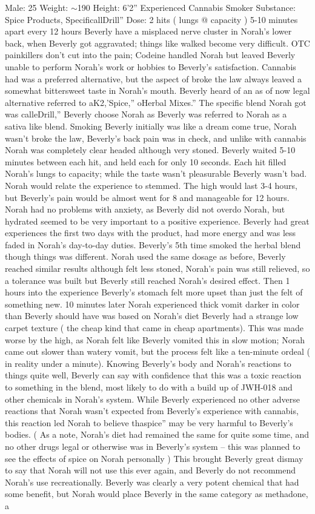 \documentclass[12pt]{book}
\begin{document}
Male: 25 Weight: $\sim$190 Height: 6'2'' Experienced Cannabis Smoker Substance: Spice Products, SpecificallDrill'' Dose: 2 hits ( lungs @  capacity ) 5-10 minutes apart every 12 hours Beverly have a misplaced nerve cluster in Norah's lower back, when Beverly got aggravated; things like walked become very difficult. OTC painkillers don't cut into the pain; Codeine handled Norah but leaved Beverly unable to perform Norah's work or hobbies to Beverly's satisfaction. Cannabis had was a preferred alternative, but the aspect of broke the law always leaved a somewhat bittersweet taste in Norah's mouth. Beverly heard of an as of now legal alternative referred to aK2,'Spice,'' oHerbal Mixes.'' The specific blend Norah got was calleDrill,'' Beverly choose Norah as Beverly was referred to Norah as a sativa like blend. Smoking Beverly initially was like a dream come true, Norah wasn't broke the law, Beverly's back pain was in check, and unlike with cannabis Norah was completely clear headed although very stoned. Beverly waited 5-10 minutes between each hit, and held each for only 10 seconds. Each hit filled Norah's lungs to  capacity; while the taste wasn't pleasurable Beverly wasn't bad. Norah would relate the experience to stemmed. The high would last 3-4 hours, but Beverly's pain would be almost went for 8 and manageable for 12 hours. Norah had no problems with anxiety, as Beverly did not overdo Norah, but hydrated seemed to be very important to a positive experience. Beverly had great experiences the first two days with the product, had more energy and was less faded in Norah's day-to-day duties. Beverly's 5th time smoked the herbal blend though things was different. Norah used the same dosage as before, Beverly reached similar results although felt less stoned, Norah's pain was still relieved, so a tolerance was built but Beverly still reached Norah's desired effect. Then 1 hours into the experience Beverly's stomach felt more upset than just the felt of something new. 10 minutes later Norah experienced thick vomit darker in color than Beverly should have was based on Norah's diet Beverly had a strange low carpet texture ( the cheap kind that came in cheap apartments). This was made worse by the high, as Norah felt like Beverly vomited this in slow motion; Norah came out slower than watery vomit, but the process felt like a ten-minute ordeal ( in reality under a minute). Knowing Beverly's body and Norah's reactions to things quite well, Beverly can say with confidence that this was a toxic reaction to something in the blend, most likely to do with a build up of JWH-018 and other chemicals in Norah's system. While Beverly experienced no other adverse reactions that Norah wasn't expected from Beverly's experience with cannabis, this reaction led Norah to believe thaspice'' may be very harmful to Beverly's bodies. ( As a note, Norah's diet had remained the same for quite some time, and no other drugs legal or otherwise was in Beverly's system -- this was planned to see the effects of spice on Norah personally ) This brought Beverly great dismay to say that Norah will not use this ever again, and Beverly do not recommend Norah's use recreationally. Beverly was clearly a very potent chemical that had some benefit, but Norah would place Beverly in the same category as methadone, a 
\end{document}
